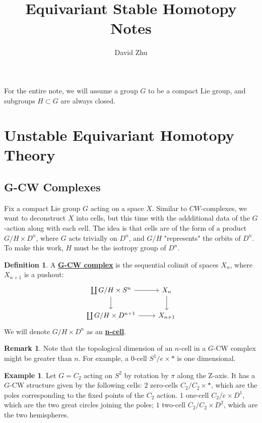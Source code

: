 \documentclass{article}
\title{Equivariant Stable Homotopy Notes}
\author{David Zhu}
\theoremstyle{definition}
\theoremstyle{definition}
\newtheorem{definition}{Definition}[theorem]
\theoremstyle{definition}
\newtheorem{remark}{Remark}[theorem]
\theoremstyle{definition}
\theoremstyle{definition}
\theoremstyle{definition}
\theoremstyle{definition}
\newtheorem{example}{Example}[theorem]
\begin{document}
\maketitle
For the entire note, we will assume a group $G$ to be a compact Lie group, and subgroups $H\subset G$ are always closed. \cite{Blumberg}

\section{Unstable Equivariant Homotopy Theory}
\subsection{G-CW Complexes}
Fix a compact Lie group $G$ acting on a space $X$. Similar to $CW$-complexes, we want to deconstruct $X$ into cells, but this time with the addditional data of the $G$-action along with each cell. The idea is that cells are of the form of a product $G/H\times D^{n}$, where $G$ acts trivially on $D^n$, and $G/H$ "represents" the orbits of $D^n$. To make this work, $H$ must be the isotropy group of $D^n$. 


\begin{tcolorbox}[colback=purple!5!white,colframe=purple!75!black]
\begin{definition}
A \underline{\textbf{G-CW complex}} is the sequential colimit of spaces $X_n$, where $X_{n+1}$ is a pushout: 
\[\begin{tikzcd}
\coprod G/H\times S^n\arrow[r]\arrow[d]&X_n\arrow[d]\\
\coprod G/H\times D^{n+1}\arrow[r]&X_{n+1}
\end{tikzcd}\]
We will denote  $G/H\times D^{n}$ as an \underline{\textbf{n-cell}}. 
\end{definition}
\end{tcolorbox}

\begin{tcolorbox}[colback=green!5!white,colframe=green!30!white]
\begin{remark}
Note that the topological dimension of an $n$-cell in a $G$-CW complex might be greater than $n$. For example, a $0$-cell $S^1/e\times *$ is one dimensional. 
\end{remark}
\end{tcolorbox}

\begin{tcolorbox}[colback=yellow!5!white,colframe=yellow!30!white]
\begin{example}
Let $G=C_2$ acting on $S^2$ by rotation by $\pi$ along the Z-axis. It has a $G$-CW structure given by the following cells: $2$ zero-cells $C_2/C_2\times *$, which are the poles corresponding to the fixed points of the $C_2$ action. $1$ one-cell $C_2/e\times D^1$, which are the two great circles joining the poles; $1$ two-cell $C_2/C_2\times D^2$, which are the two hemispheres.  
\end{example}
\end{tcolorbox}
\end{document}
